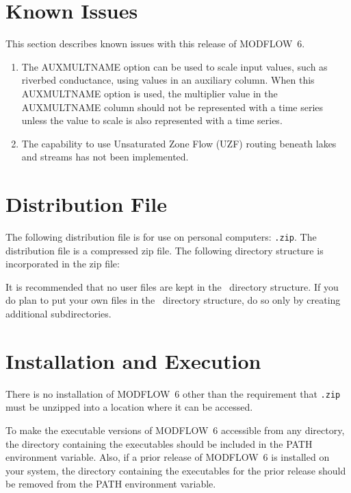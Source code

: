 \documentclass[11pt,twoside,twocolumn]{usgsreport}
\begin{document}
\section{Known Issues}
This section describes known issues with this release of MODFLOW~6.

\begin{enumerate}

\item
The AUXMULTNAME option can be used to scale input values, such as riverbed conductance, using values in an auxiliary column.  When this AUXMULTNAME option is used, the multiplier value in the AUXMULTNAME column should not be represented with a time series unless the value to scale is also represented with a time series.  

\item
The capability to use Unsaturated Zone Flow (UZF) routing beneath lakes and streams has not been implemented.

\end{enumerate}


\section{Distribution File}
The following distribution file is for use on personal computers: \texttt{\modflowversion.zip}.  The distribution file is a compressed zip file. The following directory structure is incorporated in the zip file:



It is recommended that no user files are kept in the \modflowversion~directory structure.  If you do plan to put your own files in the \modflowversion~directory structure, do so only by creating additional subdirectories.

\section{Installation and Execution}
There is no installation of MODFLOW~6 other than the requirement that \texttt{\modflowversion.zip} must be unzipped into a location where it can be accessed.  

To make the executable versions of MODFLOW~6 accessible from any directory, the directory containing the executables should be included in the PATH environment variable.  Also, if a prior release of MODFLOW~6 is installed on your system, the directory containing the executables for the prior release should be removed from the PATH environment variable.
\end{document}
